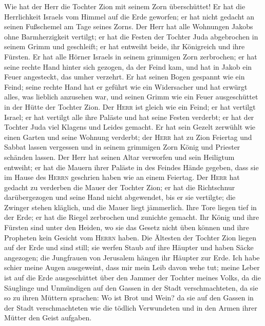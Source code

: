  Wie hat der Herr die Tochter Zion mit seinem Zorn
überschüttet! Er hat die Herrlichkeit Israels vom Himmel auf die Erde
geworfen; er hat nicht gedacht an seinen Fußschemel am Tage seines
Zorns.  Der Herr hat alle Wohnungen Jakobs ohne
Barmherzigkeit vertilgt; er hat die Festen der Tochter Juda abgebrochen
in seinem Grimm und geschleift; er hat entweiht beide, ihr Königreich
und ihre Fürsten.  Er hat alle Hörner Israels in seinem
grimmigen Zorn zerbrochen; er hat seine rechte Hand hinter sich gezogen,
da der Feind kam, und hat in Jakob ein Feuer angesteckt, das umher
verzehrt.  Er hat seinen Bogen gespannt wie ein Feind;
seine rechte Hand hat er geführt wie ein Widersacher und hat erwürgt
alles, was lieblich anzusehen war, und seinen Grimm wie ein Feuer
ausgeschüttet in der Hütte der Tochter Zion.  Der
\textsc{Herr} ist gleich wie ein Feind; er hat vertilgt Israel; er hat
vertilgt alle ihre Paläste und hat seine Festen verderbt; er hat der
Tochter Juda viel Klagens und Leides gemacht.  Er hat sein
Gezelt zerwühlt wie einen Garten und seine Wohnung verderbt; der
\textsc{Herr} hat zu Zion Feiertag und Sabbat lassen vergessen und in
seinem grimmigen Zorn König und Priester schänden lassen. 
Der Herr hat seinen Altar verworfen und sein Heiligtum entweiht; er hat
die Mauern ihrer Paläste in des Feindes Hände gegeben, dass sie im Hause
des \textsc{Herrn} geschrien haben wie an einem Feiertag. 
Der \textsc{Herr} hat gedacht zu verderben die Mauer der Tochter Zion;
er hat die Richtschnur darübergezogen und seine Hand nicht abgewendet,
bis er sie vertilgte; die Zwinger stehen kläglich, und die Mauer liegt
jämmerlich.  Ihre Tore liegen tief in der Erde; er hat die
Riegel zerbrochen und zunichte gemacht. Ihr König und ihre Fürsten sind
unter den Heiden, wo sie das Gesetz nicht üben können und ihre Propheten
kein Gesicht vom \textsc{Herrn} haben.  Die Ältesten der
Tochter Zion liegen auf der Erde und sind still; sie werfen Staub auf
ihre Häupter und haben Säcke angezogen; die Jungfrauen von Jerusalem
hängen ihr Häupter zur Erde.  Ich habe schier meine Augen
ausgeweint, dass mir mein Leib davon wehe tut; meine Leber ist auf die
Erde ausgeschüttet über den Jammer der Tochter meines Volks, da die
Säuglinge und Unmündigen auf den Gassen in der Stadt verschmachteten,
 da sie so zu ihren Müttern sprachen: Wo ist Brot und
Wein? da sie auf den Gassen in der Stadt verschmachteten wie die tödlich
Verwundeten und in den Armen ihrer Mütter den Geist aufgaben.
